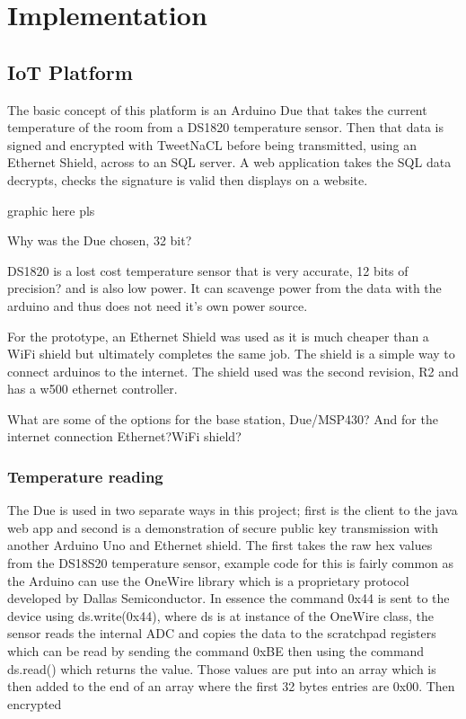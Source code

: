 
\chapter{Implementation}
\label{imple}


\section{IoT Platform}

The basic concept of this platform is an Arduino Due that takes the current temperature of the room from a DS1820 temperature sensor. Then that data is signed and encrypted with TweetNaCL before being transmitted, using an Ethernet Shield, across to an SQL server. A web application takes the SQL data decrypts, checks the signature is valid then displays on a website. 

graphic here pls

Why was the Due chosen, 32 bit?

DS1820 is a lost cost temperature sensor that is very accurate, 12 bits of precision? and is also low power. It can scavenge power from the data with the arduino and thus does not need it's own power source. 


For the prototype, an Ethernet Shield was used as it is much cheaper than a WiFi shield but ultimately completes the same job. The shield is a simple way to connect arduinos to the internet. The shield used was the second revision, R2 and has a w500 ethernet controller. 


What are some of the options for the base station, Due/MSP430?  And for the internet connection   Ethernet?WiFi shield?

\subsection{Temperature reading}

The Due is used in two separate ways in this project; first is the client to the java web app and second is a demonstration of secure public key transmission with another Arduino Uno and Ethernet shield. The first takes the raw hex values from the DS18S20 temperature sensor, example code for this is fairly common as the Arduino can use the OneWire library which is a proprietary protocol developed by Dallas Semiconductor. In essence the command 0x44 is sent to the device using ds.write(0x44), where ds is at instance of the OneWire class,
the sensor reads the internal ADC and copies the data to the scratchpad registers which can be read by sending the command 0xBE then using the command ds.read() which returns the value. Those values are put into an array which is then added to the end of an array where the first 32 bytes entries are 0x00. Then encrypted

